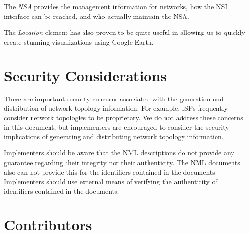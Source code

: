 \documentclass[12pt]{article}  %
\begin{document}
 The \emph{NSA} provides the management information for networks, how 
the NSI interface can be reached, and who actually maintain the NSA.

 The \emph{Location} element has also proven to be quite useful in allowing 
us to quickly create stunning visualizations using Google Earth.


\section{Security Considerations} %
\label{sec:security_considerations}


There are important security concerns associated with the generation and distribution of network topology information. For example, ISPs frequently consider network topologies to be proprietary. We do not address these concerns in this document, but implementers are encouraged to consider the security implications of generating and distributing network topology information. 

Implementers should be aware that the NML descriptions do not provide any guarantee regarding their integrity nor their authenticity. The NML documents also can not provide this for the identifiers contained in the documents. Implementers should use external means of verifying the authenticity of identifiers contained in the documents.

\section{Contributors}

% 
% 
% 
\end{document}
